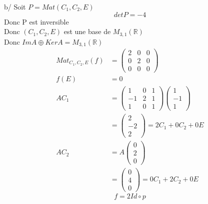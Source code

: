 \documentclass{article}
\begin{document}
b/ Soit \(P = Mat(C_1,C_2,E)\)
\begin{equation*}
    det P = -4
\end{equation*}
Donc P est inversible\\
Donc \((C_1,C_2,E)\) est une base de \(M_{3,1}(\mathbb{R})\)\\
Donc \(ImA\oplus KerA = M_{3,1}(\mathbb{R})\)
\begin{align*}
    Mat_{C_1,C_2,E}(f) &= \begin{pmatrix}
        2&0&0\\0&2&0\\0&0&0
    \end{pmatrix}\\
    f(E) &= 0\\
    AC_1 &= \begin{pmatrix}
        1&0&1\\-1&2&1\\1&0&1
    \end{pmatrix}\begin{pmatrix}
        1\\-1\\1
    \end{pmatrix}\\
    &= \begin{pmatrix}
        2\\-2\\2
    \end{pmatrix} = 2C_1 + 0C_2 + 0E\\
    AC_2 &= A\begin{pmatrix}
        0\\2\\0
    \end{pmatrix}\\
    &=\begin{pmatrix}
        0\\4\\0
    \end{pmatrix} = 0C_1 + 2C_2 + 0E
\end{align*}
\begin{equation*}
    f = 2Id \circ p
\end{equation*}
\end{document}
